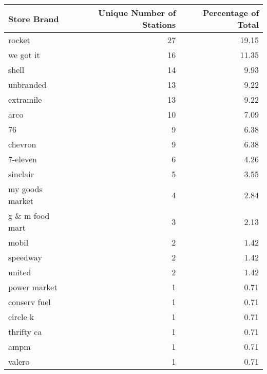 \begin{tabular}{lrr}
\toprule
\textbf{Store Brand} & \textbf{Unique Number of Stations} & \textbf{Percentage of Total} \\
\midrule
rocket & 27 & 19.15 \\
we got it & 16 & 11.35 \\
shell & 14 & 9.93 \\
unbranded & 13 & 9.22 \\
extramile & 13 & 9.22 \\
arco & 10 & 7.09 \\
76 & 9 & 6.38 \\
chevron & 9 & 6.38 \\
7-eleven & 6 & 4.26 \\
sinclair & 5 & 3.55 \\
my goods market & 4 & 2.84 \\
g \& m food mart & 3 & 2.13 \\
mobil & 2 & 1.42 \\
speedway & 2 & 1.42 \\
united & 2 & 1.42 \\
power market & 1 & 0.71 \\
conserv fuel & 1 & 0.71 \\
circle k & 1 & 0.71 \\
thrifty ca & 1 & 0.71 \\
ampm & 1 & 0.71 \\
valero & 1 & 0.71 \\
\bottomrule
\end{tabular}
